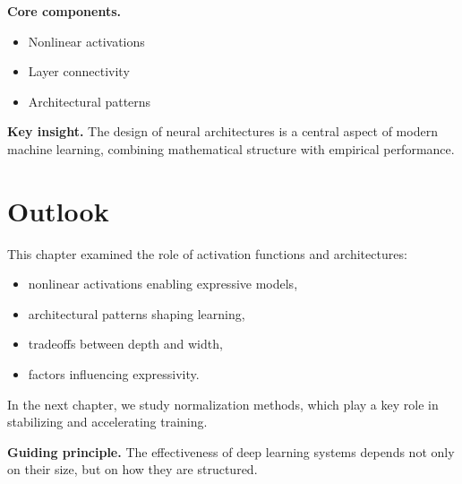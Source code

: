 \medskip

\noindent
\textbf{Core components.}
\begin{itemize}
    \item Nonlinear activations
    \item Layer connectivity
    \item Architectural patterns
\end{itemize}

\medskip

\noindent
\textbf{Key insight.}  
The design of neural architectures is a central aspect of modern machine learning, combining mathematical structure with empirical performance.

\section{Outlook}

This chapter examined the role of activation functions and architectures:
\begin{itemize}
    \item nonlinear activations enabling expressive models,
    \item architectural patterns shaping learning,
    \item tradeoffs between depth and width,
    \item factors influencing expressivity.
\end{itemize}

\medskip

In the next chapter, we study normalization methods, which play a key role in stabilizing and accelerating training.

\medskip

\noindent
\textbf{Guiding principle.}  
The effectiveness of deep learning systems depends not only on their size, but on how they are structured.